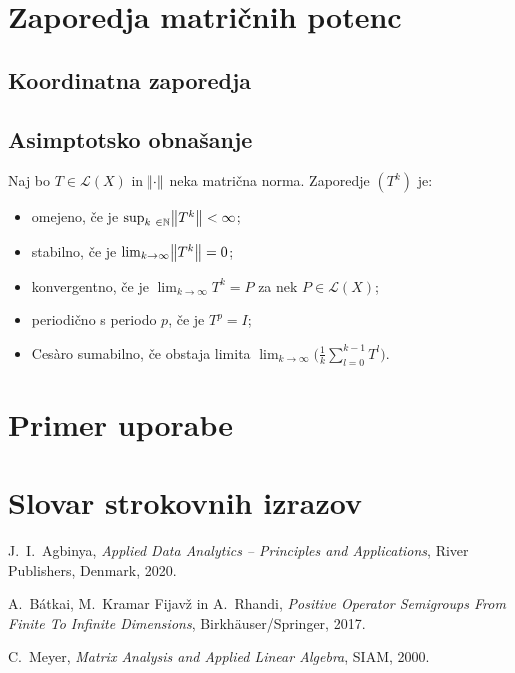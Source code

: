 \documentclass[mat1]{fmfdelo}
\newcommand{\N}{\mathbb N}
\begin{document}
\section{Zaporedja matričnih potenc}
\subsection{Koordinatna zaporedja}

\subsection{Asimptotsko obnašanje}
\begin{definicija}
    Naj bo $T \in \mathcal{L}(X)$ in $\norm{\cdot}$ neka matrična norma. Zaporedje $(T^k)$ je:
    \begin{itemize}
        \item omejeno, če je $\sup_{k \in \N} \norm{T^k} < \infty$;
        \item stabilno, če je $\lim_{k \rightarrow \infty} \norm{T^k} = 0$;
        \item konvergentno, če je $\lim_{k \rightarrow \infty} T^k = P$ za nek $P \in \mathcal{L}(X)$;
        \item periodično s periodo $p$, če je $T^p = I$;
        \item Ces\`aro sumabilno, če obstaja limita $\lim_{k \rightarrow \infty} \Big(\frac{1}{k}\sum_{l=0}^{k-1} T^l\Big)$.
    \end{itemize}
\end{definicija}

\section{Primer uporabe}

\section*{Slovar strokovnih izrazov}

\geslo{}{}
\geslo{}{}

\begin{thebibliography}{99}

 J.~I.~Agbinya, \emph{Applied Data Analytics -- Principles and Applications}, River Publishers, Denmark, 2020.

 A.~B\'{a}tkai, M.~Kramar Fijavž in A.~Rhandi, \emph{Positive Operator Semigroups From Finite To Infinite Dimensions}, Birkh\"{a}user/Springer, 2017.

 C.~Meyer, \emph{Matrix Analysis and Applied Linear Algebra}, SIAM, 2000.


\end{thebibliography}
\end{document}
